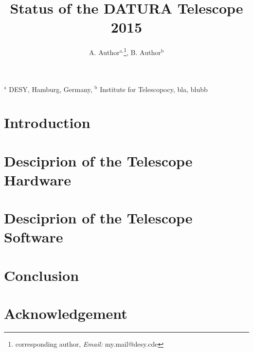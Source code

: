 \documentclass{JINST}
\title{Status of the DATURA Telescope 2015}
\author{A. Author${}^{\textrm{a},}$\thanks{corresponding author, \textit{Email:} my.mail@desy.cde}, B. Author${}^{\textrm{b}}$}
\begin{document}
 \setpagewiselinenumbers
\modulolinenumbers[5]
\linenumbers


\hspace{0.85cm}${}^{\textrm{a}}$ DESY, Hamburg, Germany, ${}^{\textrm{b}}$ Institute for Telescopocy, bla, blubb


\normalsize

\section{Introduction}


\section{Desciprion of the Telescope Hardware}
%

\section{Desciprion of the Telescope Software}
%

\section{Conclusion}

\section*{Acknowledgement}

\small


\end{document}
